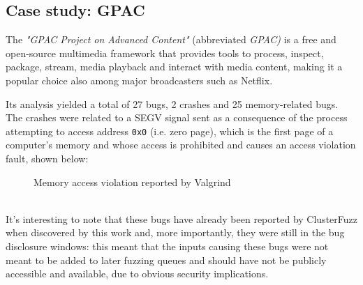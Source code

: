 \newpage
\subsection{Case study: GPAC}
The \textit{"GPAC Project on Advanced Content"} (abbreviated \textit{GPAC)} \cite{gpac} is a free and open-source multimedia framework that provides tools to process, inspect, package, stream, media playback and interact with media content, making it a popular choice also among major broadcasters such as Netflix.

Its analysis yielded a total of 27 bugs, 2 crashes and 25 memory-related bugs.
The crashes were related to a SEGV signal sent as a consequence of the process attempting to access address \verb|0x0| (i.e. zero page), which is the first page of a computer's memory and whose access is prohibited and causes an access violation fault, shown below:
\begin{figure}[h]
\caption{Memory access violation reported by Valgrind }
\label{fig:segv_gpac}
\end{figure}
\ \\
It's interesting to note that these bugs have already been reported by ClusterFuzz when discovered by this work and, more importantly, they were still in the bug disclosure windows: this meant that the inputs causing these bugs were not meant to be added to later fuzzing queues and should have not be publicly accessible and available, due to obvious security implications.

